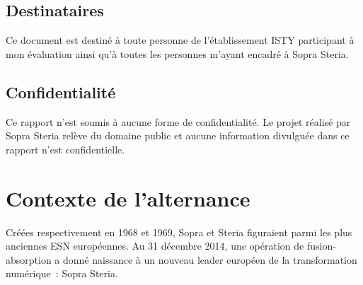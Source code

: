 \documentclass[12pt,a4paper]{article}
\begin{document}
\subsection{Destinataires}
Ce document est destiné à toute personne de l'établissement \gls{ISTY} participant à mon évaluation ainsi qu'à toutes les personnes m'ayant encadré à Sopra Steria.
\smallbreak
\subsection{Confidentialité}
Ce rapport n'est soumis à aucune forme de confidentialité. Le projet réalisé par Sopra Steria relève du domaine public et aucune information divulguée dans ce rapport n'est confidentielle.
\smallbreak
\section{Contexte de l'alternance}
Créées respectivement en 1968 et 1969, Sopra et Steria figuraient parmi les plus anciennes \gls{ESN} européennes. Au 31 décembre 2014, une opération de fusion-absorption a donné naissance à un nouveau leader européen de la transformation numérique~: Sopra Steria.
\end{document}
